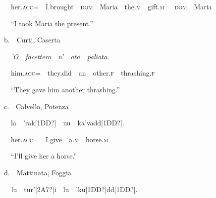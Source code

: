 \documentclass[output=paper,modfonts,nonflat]{langsci/langscibook}
\begin{document}
\begin{styleStandard}
\ \ \ \ her.\textsc{acc}=\ \ I.brought\ \ \textsc{dom}\ \ Maria\ \ the.\textsc{m}\ \ gift.\textsc{m}\ \  \ \textsc{dom}\ \ Maria
\end{styleStandard}

\begin{styleStandard}
\ \ \ \ “I took Maria the present.”
\end{styleStandard}

\begin{styleStandard}
\ \ b.\ \ Curti, Caserta
\end{styleStandard}

\begin{styleStandard}
\ \ \ \ \textit{’O\ \ facettero\ \ n’\ \ ata\ \ paliata.}
\end{styleStandard}

\begin{styleStandard}
\ \ \ \ him.\textsc{acc}=\ \ they.did\ \ an\ \ other.\textsc{f}\ \ thrashing.\textsc{f}
\end{styleStandard}

\begin{styleStandard}
\ \ \ \ “They gave him another thrashing.”
\end{styleStandard}

\begin{styleStandard}
\ \ c.\ \ Calvello, Potenza
\end{styleStandard}

\begin{styleStandard}
\ \ \ \ la\ \ {}'rak[1DD?]\ \ nu\ \ ka'vadd[1DD?].
\end{styleStandard}

\begin{styleStandard}
\ \ \ \ her.\textsc{acc}=\ \ I.give\ \ a.\textsc{m}\ \ horse.\textsc{m}
\end{styleStandard}

\begin{styleStandard}
\ \ \ \ “I’ll give her a horse.”
\end{styleStandard}

\begin{styleStandard}
\ \ d.\ \ Mattinata, Foggia
\end{styleStandard}

\begin{styleStandard}
\textit{\ \ \ \ }lu\ \ tur'[2A7?]i\ \ lu\ \ {}'ku[1DD?]dd[1DD?].
\end{styleStandard}
\end{document}
